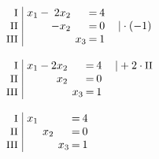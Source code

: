 \begin{equation*}
\begin{array}{l}
\setlength{\arraycolsep}{1pt}
\begin{array}{r|rcrcrcrl}
    \text{\small I } &\; x_{1} & - & 2x_{2} &  &       & = & 4 &                 \\
   \text{\small II } &\;       &   & -x_{2} &  &       & = & 0 & \quad|\cdot(-1) \\
  \text{\small III } &\;       &   &        &  & x_{3} & = & 1 &                   
\end{array}
\\ \\
\setlength{\arraycolsep}{1pt}
\begin{array}{r|rcrcrcrl}
    \text{\small I } &\; x_{1} & - & 2x_{2} &  &       & = & 4 & \quad|+2\cdot\text{\small II} \\
   \text{\small II } &\;       &   &  x_{2} &  &       & = & 0 &                               \\
  \text{\small III } &\;       &   &        &  & x_{3} & = & 1 &                                 
\end{array}
\\ \\
\setlength{\arraycolsep}{1pt}
\begin{array}{r|rcrcrcrl}
    \text{\small I } &\; x_{1} &  &       &  &       & = & 4 & \\
   \text{\small II } &\;       &  & x_{2} &  &       & = & 0 & \\
  \text{\small III } &\;       &  &       &  & x_{3} & = & 1 &   
\end{array}
\end{array}
\end{equation*}

